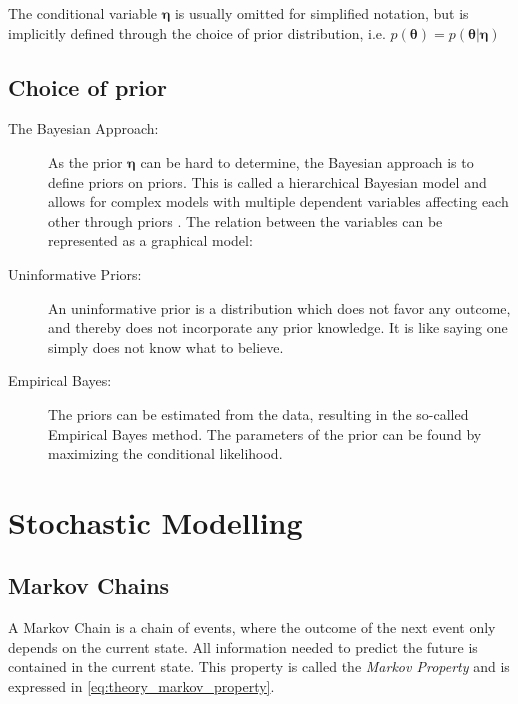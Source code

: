 The conditional variable $\boldsymbol{\eta}$ is usually omitted for simplified notation, but is implicitly defined through the choice of prior distribution, i.e. $p(\boldsymbol{\theta}) = p(\boldsymbol{\theta} | \boldsymbol{\eta})$


\subsection{Choice of prior}

\begin{description}
\item[The Bayesian Approach:]As the prior $\boldsymbol{\eta}$ can be hard to determine, the Bayesian approach is to define priors on priors. This is called a hierarchical Bayesian model and allows for complex models with multiple dependent variables affecting each other through priors \cite{murphy}. The relation between the variables can be represented as a graphical model:

\begin{figure*}[h!]
\centering    
{}
\end{figure*}

\item[Uninformative Priors:] An uninformative prior is a distribution which does not favor any outcome, and thereby does not incorporate any prior knowledge. It is like saying one simply does not know what to believe.
\item[Empirical Bayes:] The priors can be estimated from the data, resulting in the so-called Empirical Bayes method. The parameters of the prior can be found by maximizing the conditional likelihood. %
\end{description}


\section{Stochastic Modelling}

\subsection{Markov Chains}
A Markov Chain is a chain of events, where the outcome of the next event only depends on the current state. All information needed to predict the future is contained in the current state. This property is called the \textit{Markov Property} and is expressed in \cref{eq:theory_markov_property}.

